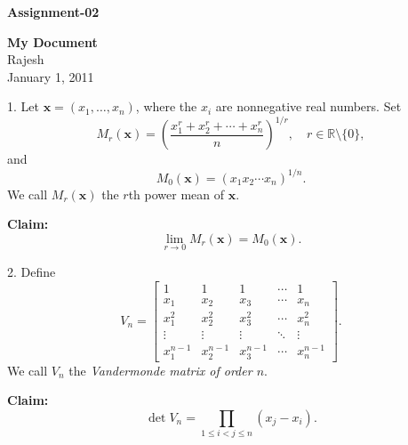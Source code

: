 \documentclass[12pt]{article}
\begin{document}
\begin{center}
    \textbf{Assignment-02}
\end{center}

\begin{center}
    \textbf{My Document} \\
    Rajesh \\
    January 1, 2011
\end{center}

\vspace{1cm}

1. Let $\mathbf{x} = (x_1, \ldots, x_n)$, where the $x_i$ are nonnegative real numbers. Set
\[
M_r(\mathbf{x}) = \left( \frac{x_1^r + x_2^r + \cdots + x_n^r}{n} \right)^{1/r}, \quad r \in \mathbb{R} \setminus \{0\},
\]
and
\[
M_0(\mathbf{x}) = (x_1 x_2 \cdots x_n)^{1/n}.
\]
We call $M_r(\mathbf{x})$ the $r$th power mean of $\mathbf{x}$. 

\textbf{Claim:}
\[
\lim_{r \to 0} M_r(\mathbf{x}) = M_0(\mathbf{x}).
\]

\vspace{0.5cm}

2. Define
\[
V_n = 
\begin{bmatrix}
    1 & 1 & 1 & \cdots & 1 \\
    x_1 & x_2 & x_3 & \cdots & x_n \\
    x_1^2 & x_2^2 & x_3^2 & \cdots & x_n^2 \\
    \vdots & \vdots & \vdots & \ddots & \vdots \\
    x_1^{n-1} & x_2^{n-1} & x_3^{n-1} & \cdots & x_n^{n-1}
\end{bmatrix}.
\]
We call $V_n$ the \textit{Vandermonde matrix of order $n$}.

\textbf{Claim:}
\[
\det V_n = \prod_{1 \leq i < j \leq n} (x_j - x_i).
\]
\end{document}
